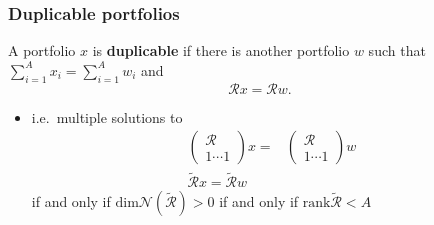 \documentclass[compress]{beamer}
\newcommand{\rank}{\mathrm{rank}}
\renewcommand{\dim}{\mathrm{dim}}
\begin{document}
\begin{frame}
  \frametitle{Duplicable portfolios}
  \begin{definition}
    A portfolio $x$ is \textbf{duplicable} if there is
    another portfolio $w$ such that $\sum_{i=1}^A x_i = \sum_{i=1}^A w_i
    $ and 
    \[ \mathcal{R} x = \mathcal{R} w. \]
  \end{definition}
  \begin{itemize}
  \item i.e.\  multiple solutions to
    \begin{align*}
      \begin{pmatrix} \mathcal{R} \\ 1 \cdots 1 \end{pmatrix} x 
      = & \begin{pmatrix} \mathcal{R} \\ 1 \cdots 1 \end{pmatrix} w
      \\
      \widetilde{\mathcal{R}} x = \widetilde{\mathcal{R}} w
    \end{align*}
    if and only if $\dim \mathcal{N}(\widetilde{\mathcal{R}})> 0$ if and
    only if $\rank \widetilde{\mathcal{R}} < A$
  \end{itemize}
\end{frame}
\end{document}
